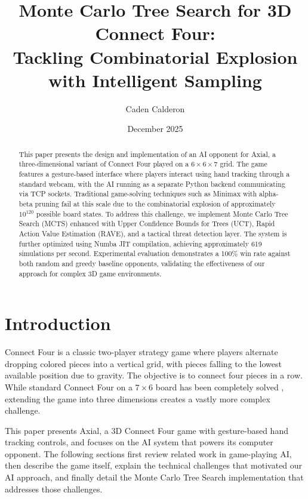\documentclass[11pt]{article}
\title{\textbf{Monte Carlo Tree Search for 3D Connect Four: \\
Tackling Combinatorial Explosion with Intelligent Sampling}}
\author{Caden Calderon}
\date{December 2025}
\begin{document}
\maketitle

\begin{abstract}
This paper presents the design and implementation of an AI opponent for Axial, a three-dimensional variant of Connect Four played on a $6 \times 6 \times 7$ grid. The game features a gesture-based interface where players interact using hand tracking through a standard webcam, with the AI running as a separate Python backend communicating via TCP sockets. Traditional game-solving techniques such as Minimax with alpha-beta pruning fail at this scale due to the combinatorial explosion of approximately $10^{120}$ possible board states. To address this challenge, we implement Monte Carlo Tree Search (MCTS) enhanced with Upper Confidence Bounds for Trees (UCT), Rapid Action Value Estimation (RAVE), and a tactical threat detection layer. The system is further optimized using Numba JIT compilation, achieving approximately 619 simulations per second. Experimental evaluation demonstrates a 100\% win rate against both random and greedy baseline opponents, validating the effectiveness of our approach for complex 3D game environments.
\end{abstract}

\section{Introduction}

Connect Four is a classic two-player strategy game where players alternate dropping colored pieces into a vertical grid, with pieces falling to the lowest available position due to gravity. The objective is to connect four pieces in a row. While standard Connect Four on a $7 \times 6$ board has been completely solved \cite{tromp1988}, extending the game into three dimensions creates a vastly more complex challenge.

This paper presents Axial, a 3D Connect Four game with gesture-based hand tracking controls, and focuses on the AI system that powers its computer opponent. The following sections first review related work in game-playing AI, then describe the game itself, explain the technical challenges that motivated our AI approach, and finally detail the Monte Carlo Tree Search implementation that addresses those challenges.
\end{document}
